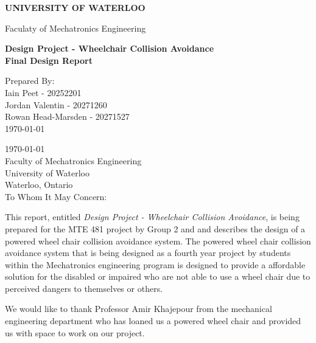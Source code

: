 \documentclass[oneside,final,a4paper]{report}
\begin{document}
\pagestyle{empty}

\begin{flushright}
 \begin{LARGE}
  \textbf{UNIVERSITY OF WATERLOO}
 \end{LARGE}

 \begin{large}
  Faculaty of Mechatronics Engineering\\[4cm]
 \end{large}

 \begin{LARGE}
  \textbf{
    Design Project - Wheelchair Collision Avoidance \\[0.0cm]
    Final Design Report
  }
 \end{LARGE}

 \vfill

  Prepared By: \\[0.2cm]
  Iain Peet - 20252201\\
  Jordan Valentin - 20271260\\
  Rowan Head-Marsden - 20271527\\
  \today
\end{flushright}
\clearpage

\today \\[0.5cm]

Faculty of Mechatronics Engineering \\
University of Waterloo \\
Waterloo, Ontario \\

To Whom It May Concern:

This report, entitled \emph{Design Project - Wheelchair Collision Avoidance}, is being prepared for the MTE 481 project by Group 2 and and describes the design of a powered wheel chair collision avoidance system.  The powered wheel chair collision avoidance system that is being designed as a fourth year project by students within the Mechatronics engineering program is designed to provide a affordable solution for the disabled or impaired who are not able to use a wheel chair due to perceived dangers to themselves or others.

We would like to thank Professor Amir Khajepour from the mechanical engineering department who has loaned us a powered wheel chair and provided us with space to work on our project.  
\end{document}
